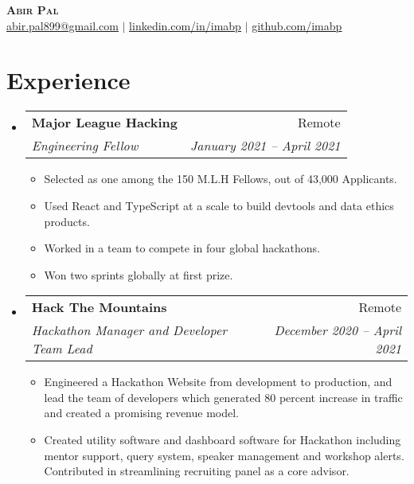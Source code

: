 \documentclass[letterpaper,11pt]{article}
\makeatletter
\newcommand{\resumeItem}[1]{
  \item\small{
    {#1 \vspace{-2pt}}
  }
}
\newcommand{\resumeSubheading}[4]{
  \vspace{-2pt}\item
    \begin{tabular*}{0.97\textwidth}[t]{l@{\extracolsep{\fill}}r}
      \textbf{#1} & #2 \\
      \textit{\small#3} & \textit{\small #4} \\
    \end{tabular*}\vspace{-7pt}
}
\newcommand{\resumeSubSubheading}[2]{
    \item
    \begin{tabular*}{0.97\textwidth}{l@{\extracolsep{\fill}}r}
      \textit{\small#1} & \textit{\small #2} \\
    \end{tabular*}\vspace{-7pt}
}
\newcommand{\resumeSubHeadingListStart}{\begin{itemize}[leftmargin=0.15in, label={}]}
\newcommand{\resumeSubHeadingListEnd}{\end{itemize}}
\newcommand{\resumeItemListStart}{\begin{itemize}}
\newcommand{\resumeItemListEnd}{\end{itemize}\vspace{-5pt}}
\makeatother
\begin{document}

\begin{center}
    \textbf{\Huge \scshape Abir Pal} \\ \vspace{1pt}
    \href{mailto:abir.pal899@gmail.com}{\underline{abir.pal899@gmail.com}} $|$ 
    \href{https://linkedin.com/in/imabp}{\underline{linkedin.com/in/imabp}} $|$
    \href{https://github.com/imabp}{\underline{github.com/imabp}}
\end{center}


\section{Experience}
  \resumeSubHeadingListStart

    \resumeSubheading
      {Major League Hacking}{Remote}
      {Engineering Fellow}{January 2021 -- April 2021}
      \resumeItemListStart
        \resumeItem{Selected as one among the 150 M.L.H Fellows, out of 43,000 Applicants. }
         \resumeItem{Used React and TypeScript at a scale to build devtools and data ethics products.}
         \resumeItem{Worked in a team to compete in four global hackathons.}
         \resumeItem{Won two sprints globally at first prize.}
     \resumeItemListEnd

    \resumeSubheading
      {Hack The Mountains}{Remote}
      {Hackathon Manager and Developer Team Lead}{December 2020 -- April 2021}
      \resumeItemListStart
        \resumeItem{Engineered a Hackathon Website from development to production, and lead the team of developers which generated 80 percent increase in traffic and created a promising revenue model.}
        \resumeItem{Created utility software and dashboard software for Hackathon including mentor support, query system, speaker management and workshop alerts. Contributed in streamlining recruiting panel as a core advisor.}
        
    
      \resumeItemListEnd
  \resumeSubHeadingListEnd


\end{document}
